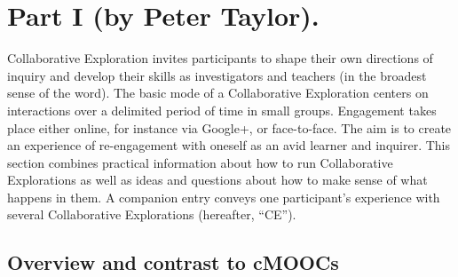 \section*{Part I (by Peter Taylor).}

Collaborative Exploration invites participants to shape their own
directions of inquiry and develop their skills as investigators and
teachers (in the broadest sense of the word). The basic mode of a
Collaborative Exploration centers on interactions over a delimited
period of time in small groups. Engagement takes place either online,
for instance via Google+, or face-to-face. The aim is to create an
experience of re-engagement with oneself as an avid learner and
inquirer. This section combines practical information about how to run
Collaborative Explorations as well as ideas and questions about how to
make sense of what happens in them. A companion entry conveys one
participant's experience with several Collaborative Explorations
(hereafter, ``CE'').

\subsection{Overview and contrast to cMOOCs}

